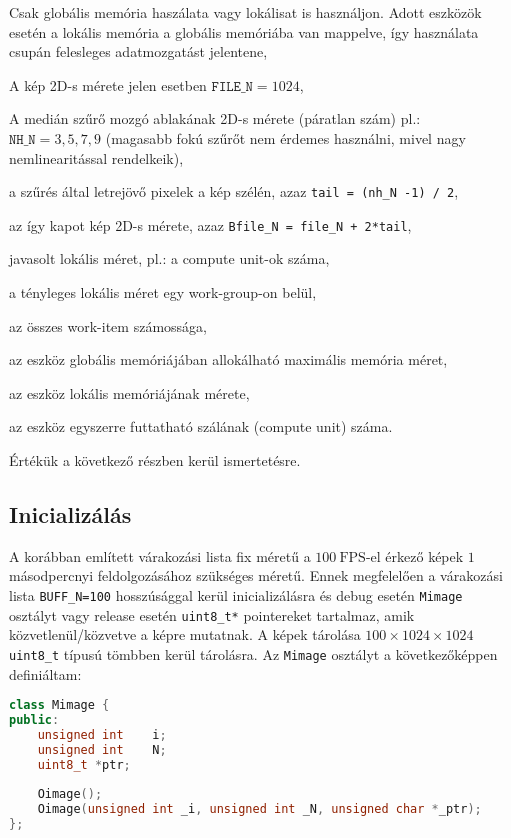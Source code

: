 	\begin{description}[noitemsep]
	\item[only\_global] Csak globális memória haszálata vagy lokálisat is használjon. Adott eszközök esetén a lokális memória a
	globális memóriába van mappelve, így használata csupán felesleges adatmozgatást jelentene,
	\item[file\_N] A kép 2D-s mérete jelen esetben $\texttt{FILE\_N} = 1024$,
	\item[nh\_N] A medián szűrő mozgó ablakának 2D-s mérete (páratlan szám) pl.: $\texttt{NH\_N} = 3,5,7,9$ (magasabb fokú szűrőt nem
	érdemes használni, mivel nagy nemlinearitással rendelkeik),
	\item[tail] a szűrés által letrejövő pixelek a kép szélén, azaz \texttt{tail = (nh\_N -1) / 2},
	\item[Bfile\_N] az így kapot kép 2D-s mérete, azaz \texttt{Bfile\_N = file\_N + 2*tail},
	\item[pplN] javasolt lokális méret, pl.: a compute unit-ok száma,
	\item[localN] a tényleges lokális méret egy work-group-on belül,
	\item[globalN] az összes work-item számossága,
	\item[aSize] az eszköz globális memóriájában allokálható maximális memória méret,
	\item[lSize] az eszköz lokális memóriájának mérete,
	\item[mCuint] az eszköz egyszerre futtatható szálának (compute unit) száma.
	\end{description}
	Értékük a következő részben kerül ismertetésre.
	

	\subsection*{Inicializálás}
	A korábban említett várakozási lista fix méretű a $100\ \mathrm{FPS}$-el érkező képek $1$ másodpercnyi feldolgozásához szükséges
	méretű. Ennek megfelelően a várakozási lista \texttt{BUFF\_N=100} hosszúsággal kerül inicializálásra és debug
	esetén \texttt{Mimage} osztályt vagy release esetén \texttt{uint8\_t*} pointereket tartalmaz, amik közvetlenül/közvetve a
	képre mutatnak. A képek tárolása $100 \times 1024 \times 1024$ \texttt{uint8\_t} típusú tömbben kerül tárolásra.
	Az \texttt{Mimage} osztályt a következőképpen definiáltam:
	
\begin{lstlisting}[language=C++]
class Mimage {
public:
	unsigned int	i;
	unsigned int	N;
	uint8_t	*ptr;
	
	Oimage();
	Oimage(unsigned int _i, unsigned int _N, unsigned char *_ptr);
};
\end{lstlisting}

